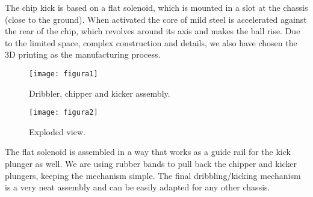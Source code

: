 The chip kick is based on a flat solenoid, which is mounted in a slot at the
chassis (close to the ground). When activated the core of mild steel is
accelerated against the rear of the chip, which revolves around its axis and
makes the ball rise. Due to the limited space, complex construction and
details, we also have chosen the 3D printing as the manufacturing process.

\begin{figure}[thpb]
    \centering
    \texttt{[image: figura1]}
    \caption{Dribbler, chipper and kicker assembly.}
    \label{figura1}

    \texttt{[image: figura2]}
    \caption{Exploded view.}
    \label{figura2}
\end{figure}

The flat solenoid is assembled in a way that works as a guide rail for the kick
plunger as well. We are using rubber bands to pull back the chipper and kicker
plungers, keeping the mechanism simple. The final dribbling/kicking mechanism
is a very neat assembly and can be easily adapted for any other chassis.

